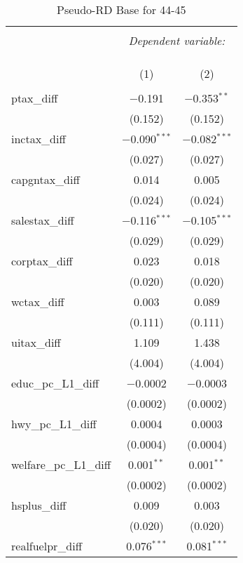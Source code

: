 
\begin{table}[!htbp] \centering 
  \caption{Pseudo-RD Base for  44-45} 
  \label{} 
\begin{tabular}{@{\extracolsep{5pt}}lcc} 
\\[-1.8ex]\hline 
\hline \\[-1.8ex] 
 & \multicolumn{2}{c}{\textit{Dependent variable:}} \\ 
\cline{2-3} 
\\[-1.8ex] & \multicolumn{2}{c}{ } \\ 
\\[-1.8ex] & (1) & (2)\\ 
\hline \\[-1.8ex] 
 ptax\_diff & $-$0.191 & $-$0.353$^{**}$ \\ 
  & (0.152) & (0.152) \\ 
  inctax\_diff & $-$0.090$^{***}$ & $-$0.082$^{***}$ \\ 
  & (0.027) & (0.027) \\ 
  capgntax\_diff & 0.014 & 0.005 \\ 
  & (0.024) & (0.024) \\ 
  salestax\_diff & $-$0.116$^{***}$ & $-$0.105$^{***}$ \\ 
  & (0.029) & (0.029) \\ 
  corptax\_diff & 0.023 & 0.018 \\ 
  & (0.020) & (0.020) \\ 
  wctax\_diff & 0.003 & 0.089 \\ 
  & (0.111) & (0.111) \\ 
  uitax\_diff & 1.109 & 1.438 \\ 
  & (4.004) & (4.004) \\ 
  educ\_pc\_L1\_diff & $-$0.0002 & $-$0.0003 \\ 
  & (0.0002) & (0.0002) \\ 
  hwy\_pc\_L1\_diff & 0.0004 & 0.0003 \\ 
  & (0.0004) & (0.0004) \\ 
  welfare\_pc\_L1\_diff & 0.001$^{**}$ & 0.001$^{**}$ \\ 
  & (0.0002) & (0.0002) \\ 
  hsplus\_diff & 0.009 & 0.003 \\ 
  & (0.020) & (0.020) \\ 
  realfuelpr\_diff & 0.076$^{***}$ & 0.081$^{***}$ \\ 

\end{tabular}
\end{table}
